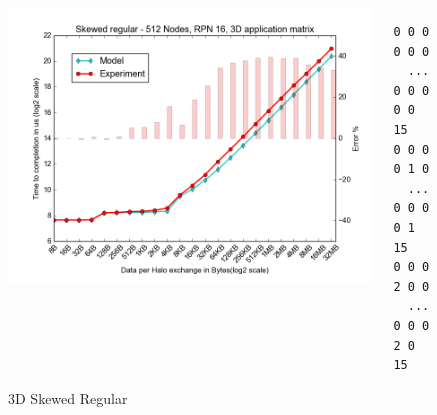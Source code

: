 \documentclass{beamer}
\begin{document}
\begin{frame}[fragile]
\begin{figure}
\caption{3D Skewed Regular}
\begin{columns}
  \begin{column}{0.6\textwidth}
    \includegraphics[width=1\textwidth]{../mappings/3d_skewed_regular.png}
  \end{column}
  \begin{column}{0.3\textwidth}
\lstset{title=Mapping sample}
\begin{lstlisting}[basicstyle=\footnotesize\ttfamily, frame=lines,columns=fixed]
0 0 0 0 0 0
  ...
0 0 0 0 0 15
0 0 0 0 1 0
  ...
0 0 0 0 1 15
0 0 0 2 0 0
  ...
0 0 0 2 0 15
\end{lstlisting}
  \end{column}
\end{columns}
\end{figure}
\end{frame}
\end{document}

